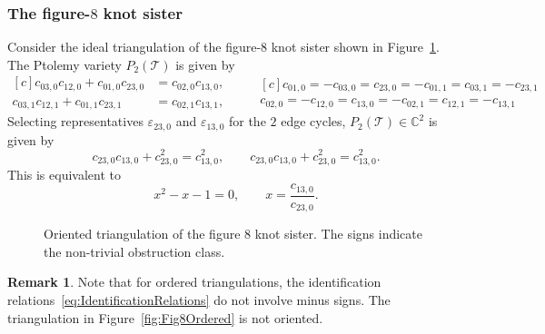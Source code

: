 \documentclass[12pt]{amsart}
\theoremstyle{definition}
\newtheorem{remark}[theorem]{Remark}
\numberwithin{equation}{section}
\def\C{\mathbb{C}}
\def\Q{\mathbb{Q}}
\def\T{\mathcal{T}}
\begin{document}
\subsubsection{The figure-$8$ knot sister}
Consider the ideal triangulation of the figure-$8$ knot sister shown in Figure~\ref{fig:Fig8SisOri}. The Ptolemy variety $P_2(\T)$ is given by
\begin{equation}\label{eq:Fig8SisPtolemyUnsimplified}
\begin{aligned}[c]
c_{03,0}c_{12,0}+c_{01,0}c_{23,0}&=c_{02,0}c_{13,0},\\
c_{03,1}c_{12,1}+c_{01,1}c_{23,1}&=c_{02,1}c_{13,1},
\end{aligned}
\qquad 
\begin{aligned}[c]
c_{01,0}=-c_{03,0}=c_{23,0}=-c_{01,1}=c_{03,1}=-c_{23,1}\\
c_{02,0}=-c_{12,0}=c_{13,0}=-c_{02,1}=c_{12,1}=-c_{13,1}
\end{aligned}
\end{equation}
Selecting representatives $\varepsilon_{23,0}$ and $\varepsilon_{13,0}$ for the $2$ edge cycles, $P_2(\T)\in\C^2$ is given by
\begin{equation}\label{eq:Fig8SisPtolemyTrivial}
c_{23,0}c_{13,0}+c_{23,0}^2=c_{13,0}^2,\qquad c_{23,0}c_{13,0}+c_{23,0}^2=c_{13,0}^2.
\end{equation}
This is equivalent to
\begin{equation}
x^2-x-1=0,\qquad x=\frac{c_{13,0}}{c_{23,0}}.
\end{equation}


\begin{figure}[htpb]
\centering
\begin{minipage}[c]{0.48\textwidth}
\scalebox{0.57}{}
\captionsetup{width=10cm}
\caption{Ordered triangulation of the figure $8$ knot. The signs indicate the non-trivial obstruction class.}\label{fig:Fig8Ordered}
\end{minipage}	
\hspace{2mm}
\begin{minipage}[c]{0.48\textwidth}
\scalebox{0.57}{}
\captionsetup{width=10cm}
\caption{Oriented triangulation of the figure $8$ knot sister. The signs indicate the non-trivial obstruction class.}\label{fig:Fig8SisOri}
\end{minipage}					
\end{figure}
\begin{remark}
Note that for ordered triangulations, the identification relations~\eqref{eq:IdentificationRelations} do not involve minus signs. The triangulation in Figure~\ref{fig:Fig8Ordered} is not oriented.



\end{remark}
\end{document}
